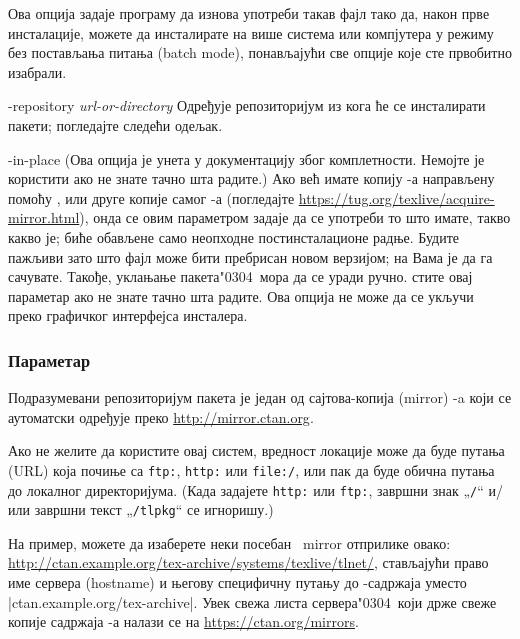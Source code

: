 \documentclass{article}
\begin{document}
\begin{ttdescription}
Ова опција задаје програму да изнова употреби такав фајл
  тако да, након прве инсталације, можете да инсталирате \TL{} на више
  система или компјутера у режиму без постављања питања (batch mode),
  понављајући све опције које сте првобитно изабрали.

\item [-repository {\sl url-or-directory}] Одређује репозиторијум из
  кога ће се инсталирати пакети; погледајте следећи одељак.

\item[-in-place] (Ова опција је унета у документацију због
  комплетности. Немојте је користити ако не знате тачно шта радите.)
  Ако већ имате копију \TL{}-а направљену помоћу ,
   или друге копије самог \TL{}-а (погледајте
  \url{https://tug.org/texlive/acquire-mirror.html}), онда се овим
  параметром задаје да се употреби то што имате, такво какво је; биће
  обављене само неопходне постинсталационе радње. Будите пажљиви зато
  што фајл  може бити пребрисан новом
  верзијом; на Вама је да га сачувате. Такође, уклањање
  пакета\char"0304\ мора да се уради ручно. стите овај параметар ако
  не знате тачно шта радите. Ова опција не може да се укључи преко
  графичког интерфејса инсталера.


\end{ttdescription}


\subsubsection{Параметар }
\label{sec:location}

Подразумевани репозиторијум пакета је један од сајтова-копија
(mirror) \CTAN{}-a који се аутоматски одређује преко
\url{http://mirror.ctan.org}.

Ако не желите да користите овај систем, вредност локације може да
буде путања (URL) која почиње са \texttt{ftp:}, \texttt{http:} или
\texttt{file:/}, или пак да буде обична путања до локалног
директоријума. (Када задајете \texttt{http:} или \texttt{ftp:},
завршни знак „\texttt{/}“ и/или завршни текст
„\texttt{/tlpkg}“ се игноришу.)

На пример, можете да изаберете неки посебан \CTAN\ mirror отприлике
овако:
\url{http://ctan.example.org/tex-archive/systems/texlive/tlnet/},
стављајући право име сервера (hostname) и његову специфичну путању до
\CTAN-садржаја уместо |ctan.example.org/tex-archive|. Увек свежа
листа сервера\char"0304\ који држе свеже копије садржаја \CTAN-а
налази се на \url{https://ctan.org/mirrors}.
\end{document}
